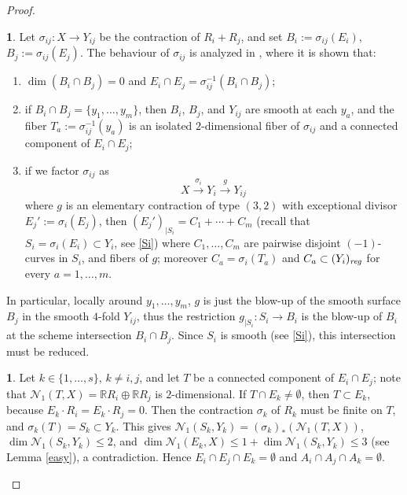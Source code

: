\documentclass[a4paper,12pt]{amsart}
\theoremstyle{definition}
\newtheorem{prg}[thm]{}
\numberwithin{figure}{section}
\numberwithin{table}{section}
\newcommand{\la}{\longrightarrow}
\newcommand{\R}{\mathbb{R}}
\newcommand{\N}{\mathcal{N}_1}
\newcommand{\reg}{\text{\it reg}}
\begin{document}
\begin{proof}
\begin{prg}
Let $\sigma_{ij}\colon X\to Y_{ij}$ be the contraction of $R_i+R_j$, and
set  $B_i:=\sigma_{ij}(E_i)$, $B_j:=\sigma_{ij}(E_j)$.
The behaviour of $\sigma_{ij}$ is analyzed in  \cite[Prop.~3.4 and its proof]{32}, where it is shown that:
\begin{enumerate}
  \item $\dim(B_i\cap B_j)=0$ and $E_{i}\cap E_{j}=\sigma_{ij}^{-1}(B_i\cap B_j)$;
\item
  if $B_i\cap B_j=\{y_1,\dotsc,y_m\}$, then  $B_i$, $B_j$, and $Y_{ij}$ are smooth at each $y_a$, and the fiber $T_a:=\sigma_{ij}^{-1}(y_a)$ is an isolated $2$-dimensional fiber of $\sigma_{ij}$ and a connected component  of $E_i\cap E_j$;
   \item  if 
we factor $\sigma_{ij}$ as
$$X\stackrel{\sigma_i}{\la}Y_i\stackrel{g}{\la} Y_{ij}$$
where $g$ is an elementary contraction of type $(3,2)$ with exceptional divisor $E_j':=\sigma_i(E_j)$, then $(E_j')_{|S_i}=C_1+\cdots+C_m$ (recall that
$S_i=\sigma_i(E_i)\subset Y_i$, see \ref{Si})
where $C_1,\dotsc,C_m$ are pairwise disjoint $(-1)$-curves in $S_i$, and fibers of $g$; moreover $C_a=\sigma_i(T_a)$ and $C_a\subset (Y_i)_{\reg}$ for every $a=1,\dotsc,m$.
    \end{enumerate}
 In particular, locally around $y_1,\dotsc,y_m$, $g$ is just the blow-up of the smooth surface $B_j$ in the smooth $4$-fold $Y_{ij}$, thus the restriction $g_{|S_i}\colon S_i\to B_i$ is the blow-up of $B_i$ at the scheme intersection $B_i\cap B_j$. Since $S_i$ is smooth (see \ref{Si}), this intersection must be reduced.
\end{prg}
\begin{prg}\label{torquay}
Let $k\in\{1,\dotsc,s\}$, $k\neq i,j$, and let $T$ be a connected component of $E_i\cap E_j$; note that $\N(T,X)=\R R_i\oplus\R R_j$ is $2$-dimensional. If $T\cap E_k\neq\emptyset$, then $T\subset E_k$, because $E_k\cdot R_i=E_k\cdot R_j=0$. Then the contraction $\sigma_k$ of $R_k$ must be finite on $T$, and $\sigma_k(T)=S_k\subset Y_k$. 
This gives
$\N(S_k,Y_k)=(\sigma_k)_*(\N(T,X))$, $\dim\N(S_k,Y_k)\leq 2$,
and $\dim\N(E_k,X)\leq 1+\dim\N(S_k,Y_k)\leq 3$
(see Lemma \ref{easy}), a contradiction. Hence $E_i\cap E_j\cap E_k=\emptyset$ and $A_i\cap A_j\cap A_k=\emptyset$.


\end{prg}
\end{proof}
\end{document}
